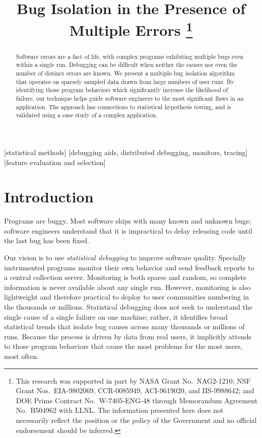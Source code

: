 \documentclass{sig-alternate}
\title{Bug Isolation in the Presence of Multiple Errors
  \thanks{This research was supported in part by NASA Grant No.\
    NAG2-1210; NSF Grant Nos.\ EIA-9802069, CCR-0085949, ACI-9619020,
    and IIS-9988642; and DOE Prime Contract No.\ W-7405-ENG-48 through
    Memorandum Agreement No.\ B504962 with LLNL.  The information
    presented here does not necessarily reflect the position or the
    policy of the Government and no official endorsement should be
    inferred.}}
\author{
  \alignauthor Ben Liblit \eecs \\
  \alignauthor Mayur Naik \stan \\
  \alignauthor Alice X.\ Zheng \eecs \\
  \moreauthors
  \global\multiply\auwidth by 3
  \global\divide\auwidth by 2
  \alignauthor Alex Aiken \stan \\
  \alignauthor Michael I.\ Jordan \both
  \moreauthors
  \alignauthor
  \affaddr{\eecs Department of Electrical \\ Engineering and Computer Science} \\
  \affaddr{\stat Department of Statistics} \\
  \affaddr{University of California, Berkeley} \\
  \affaddr{Berkeley, CA 94720-1776}
  \alignauthor
  \affaddr{\stan Computer Science Department} \\
  \affaddr{353 Serra Mall} \\
  \affaddr{Stanford University} \\
  \affaddr{Stanford CA 94305-9025}
}
\begin{document}
\CopyrightYear{2004}
\maketitle

\begin{abstract}
  Software errors are a fact of life, with complex programs exhibiting
  multiple bugs even within a single run.  Debugging can be difficult
  when neither the causes nor even the number of distinct errors are
  known.  We present a multiple-bug isolation algorithm that operates
  on sparsely sampled data drawn from large numbers of user runs.  By
  identifying those program behaviors which significantly increase the
  likelihood of failure, our technique helps guide software engineers
  to the most significant flaws in an application.  The approach has
  connections to statistical hypothesis testing, and is validated
  using a case study of a complex application.
\end{abstract}

[statistical methods]
[debugging aids, distributed debugging, monitors, tracing]
[feature
  evaluation and selection]




\section{Introduction}
\label{sec:introduction}

Programs are buggy.
Most software ships with many known and unknown bugs; software
engineers understand that it is impractical to delay releasing code
until the last bug has been fixed.

Our vision is to use {\em statistical debugging} to
improve software quality.  Specially
instrumented programs monitor their own behavior and send feedback
reports to a central collection server.  Monitoring is both sparse and
random, so complete information is never available about
any single run.  However, monitoring is also lightweight and therefore
practical to deploy to user communities numbering in the thousands or
millions.  Statistical debugging does not seek to understand the
single cause of a single failure on one machine; rather, it identifies
broad statistical trends that isolate bug causes across many thousands
or millions of runs.  Because the process is driven by data from real
users, it implicitly attends to those program behaviors that cause the
most problems for the most users, most often.
\end{document}

